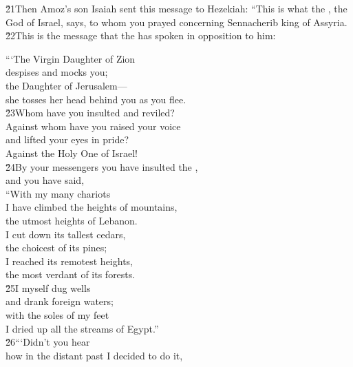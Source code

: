 \v{21}Then Amoz's son Isaiah sent this message to Hezekiah: ``This is what the , the God of Israel, says, to whom you prayed concerning Sennacherib king of Assyria. \v{22}This is the message that the  has spoken in opposition to him:

\begin{poetry}
\poeml ```The Virgin Daughter of Zion \\
\poemll    despises and mocks you; \\
\poeml the Daughter of Jerusalem--- \\
\poemll    she tosses her head behind you as you flee. \\
\poeml \v{23}Whom have you insulted and reviled? \\
\poemll    Against whom have you raised your voice \\
\poeml and lifted your eyes in pride? \\
\poemll    Against the Holy One of Israel! \\
\poeml \v{24}By your messengers you have insulted the , \\
\poemll    and you have said, \\
\poeml ``With my many chariots \\
\poemll    I have climbed the heights of mountains, \\
\poemlll       the utmost heights of Lebanon. \\
\poeml I cut down its tallest cedars, \\
\poemll    the choicest of its pines; \\
\poeml I reached its remotest heights, \\
\poemll    the most verdant of its forests. \\
\poeml \v{25}I myself dug wells \\
\poemll    and drank foreign waters; \\
\poeml with the soles of my feet \\
\poemll    I dried up all the streams of Egypt.'' \\
\poeml \v{26}```Didn't you hear \\
\poemll    how in the distant past I decided to do it, \\

\end{poetry}
